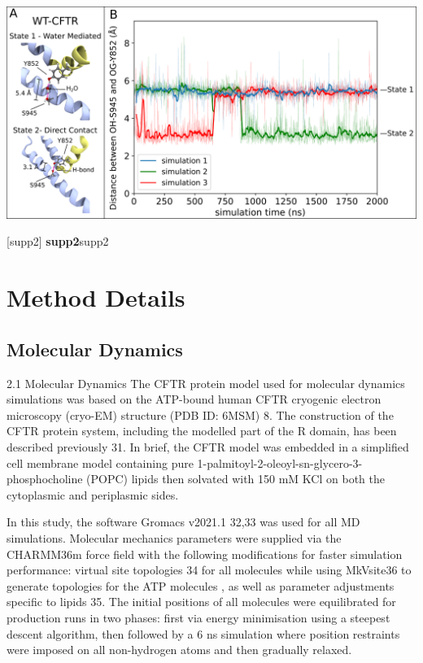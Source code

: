 \begin{center}
	\includegraphics[width=\textwidth]{figures/S945L/Supp2_MD.pdf}
\end{center}
\captionsetup{singlelinecheck = false, justification=raggedright}
\begingroup
{}[supp2] {\textbf{supp2}}{supp2}
\label{S945L_MD_2}
\endgroup

\section{Method Details}
\subsection{Molecular Dynamics}
2.1 Molecular Dynamics
The CFTR protein model used for molecular dynamics simulations was based on the ATP-bound human CFTR cryogenic electron microscopy (cryo-EM) structure (PDB ID: 6MSM) \cite{zhang2018}8. The construction of the CFTR protein system, including the modelled part of the R domain, has been described previously \cite{wong2022}31. In brief, the CFTR model was embedded in a simplified cell membrane model containing pure 1-palmitoyl-2-oleoyl-sn-glycero-3-phosphocholine (POPC) lipids then solvated with 150 mM KCl on both the cytoplasmic and periplasmic sides.

In this study, the software Gromacs v2021.1 \cite{abraham2015}32,33 was used for all MD simulations. Molecular mechanics parameters were supplied via the CHARMM36m\cite{huang2016} force field with the following modifications for faster simulation performance: virtual site topologies \cite{feenstra1999}34 for all molecules while using MkVsite36 to generate topologies for the ATP molecules \cite{larsson2020}, as well as parameter adjustments specific to lipids \cite{olesen2018}35. The initial positions of all molecules were equilibrated for production runs in two phases: first via energy minimisation using a steepest descent algorithm, then followed by a 6 ns simulation where position restraints were imposed on all non-hydrogen atoms and then gradually relaxed. 

